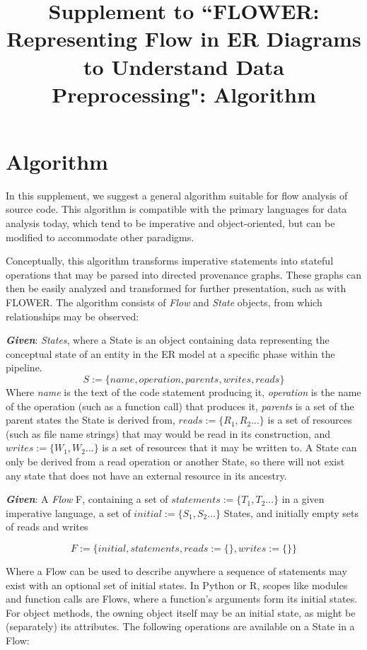 \documentclass{llncs}
\newcommand{\+}{\discretionary{\mbox{${\bm\cdot}\mkern-1mu$}}{}{}}
\begin{document}
\title{Supplement to ``FLOWER: Representing Flow in ER Diagrams to Understand Data Preprocessing": Algorithm}
\author{}
\institute{}
\maketitle


\section{Algorithm}
 In this supplement, we suggest a general algorithm suitable for flow analysis of source code. This algorithm is compatible with the primary languages for data analysis today, which tend to be
imperative and object-oriented, but can be modified to accommodate other paradigms.

Conceptually, this algorithm transforms imperative statements into stateful operations that may be parsed into directed provenance graphs. These graphs can then be easily analyzed and transformed for further presentation, such as with FLOWER. The algorithm consists of \textit{Flow} and \textit{State} objects, 
from which relationships may be observed:

\textit{\textbf{Given}}: \textit{States}, where a State is an object containing data representing the conceptual state of an entity in the ER model at a specific phase within the pipeline.
\[S := \{name, operation, parents, writes, reads \}\]
Where \textit{name} is the text of the code statement producing it, \textit{operation} is the name of the operation (such as a function call) that produces it, \textit{parents} is a set of the parent states the State is derived from, $reads :=\{R_1, R_2...\}$ is a set of resources (such as file name strings) that may would be read in its construction, and $writes :=\{W_1, W_2...\}$ is a set of resources that it may be written to. A State can only be derived from a read operation or another State, so there will not exist any state that does not have an external resource in its ancestry.

\textit{\textbf{Given}}: A \textit{Flow} F, containing a set of $statements := \{T_1, T_2...\}$ in a given imperative language, a set of $initial := \{S_1, S_2...\}$ States, and initially empty sets of reads and writes

\[F := \{initial, statements, reads:= \{\}, writes := \{\}\}\]

Where a Flow can be used to describe anywhere a sequence of statements may exist with an optional set of initial states. In Python or R, scopes like modules and function calls are Flows, where a function's arguments form its initial states. For object methods, the owning object itself may be an initial state, as might be (separately) its attributes. The following operations are available on a State in a Flow:
\end{document}
